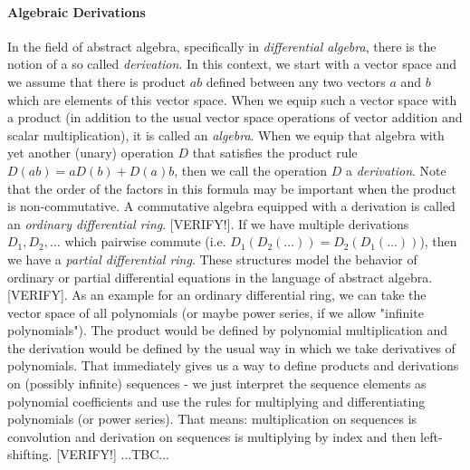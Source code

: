 \paragraph{Algebraic Derivations}
In the field of abstract algebra, specifically in \emph{differential algebra}, there is the notion of a so called \emph{derivation}. In this context, we start with a vector space and we assume that there is product $a b$ defined between any two vectors $a$ and $b$ which are elements of this vector space. When we equip such a vector space with a product (in addition to the usual vector space operations of vector addition and scalar multiplication), it is called an \emph{algebra}. When we equip that algebra with yet another (unary) operation $D$ that satisfies the product rule $D(a b) = a D(b) + D(a) b$, then we call the operation $D$ a \emph{derivation}. Note that the order of the factors in this formula may be important when the product is non-commutative. A commutative algebra equipped with a derivation is called an \emph{ordinary differential ring}. [VERIFY!]. If we have multiple derivations $D_1, D_2, \ldots$ which pairwise commute (i.e. $D_1(D_2(\ldots)) = D_2(D_1(\ldots))$), then we have a \emph{partial differential ring}. These structures model the behavior of ordinary or partial differential equations in the language of abstract algebra. [VERIFY]. As an example for an ordinary differential ring, we can take the vector space of all polynomials (or maybe power series, if we allow "infinite polynomials"). The product would be defined by polynomial multiplication and the derivation would be defined by the usual way in which we take derivatives of polynomials. That immediately gives us a way to define products and derivations on (possibly infinite) sequences - we just interpret the sequence elements as polynomial coefficients and use the rules for multiplying and differentiating polynomials (or power series). That means: multiplication on sequences is convolution and derivation on sequences is multiplying by index and then left-shifting. [VERIFY!] ...TBC...


%
%

